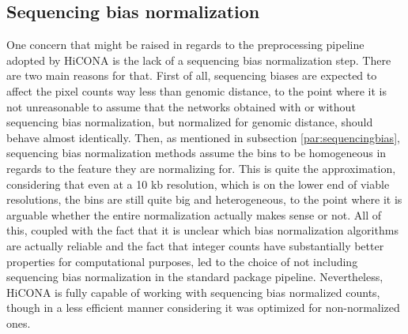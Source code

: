 \subsection{Sequencing bias normalization}
One concern that might be raised in regards to the preprocessing pipeline adopted by HiCONA is the lack of a sequencing bias normalization step. There are two main reasons for that. First of all, sequencing biases are expected to affect the pixel counts way less than genomic distance, to the point where it is not unreasonable to assume that the networks obtained with or without sequencing bias normalization, but normalized for genomic distance, should behave almost identically. Then, as mentioned in subsection \ref{par:sequencingbias}, sequencing bias normalization methods assume the bins to be homogeneous in regards to the feature they are normalizing for. This is quite the approximation, considering that even at a 10 kb resolution, which is on the lower end of viable resolutions, the bins are still quite big and heterogeneous, to the point where it is arguable whether the entire normalization actually makes sense or not. All of this, coupled with the fact that it is unclear which bias normalization algorithms are actually reliable and the fact that integer counts have substantially better properties for computational purposes, led to the choice of not including sequencing bias normalization in the standard package pipeline. Nevertheless, 
HiCONA is fully capable of working with sequencing bias normalized counts, though in a less efficient manner considering it was optimized for non-normalized ones.

